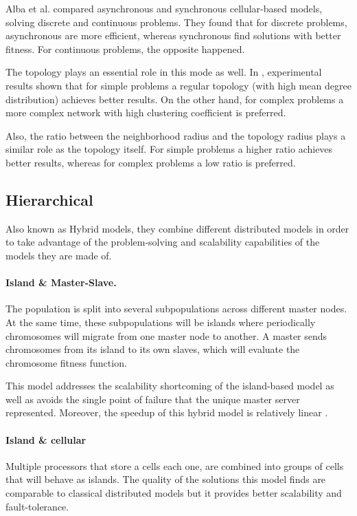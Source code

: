 Alba et al. \cite{2} compared asynchronous and synchronous cellular-based models, solving discrete and continuous problems. They found that for discrete problems, asynchronous are more efficient, whereas synchronous find solutions with better fitness. For continuous problems, the opposite happened.

The topology plays an essential role in this mode as well. In \cite{68}, experimental results shown that for simple problems a regular topology (with high mean degree distribution) achieves better results. On the other hand, for complex problems a more complex network with high clustering coefficient is preferred.

Also, the ratio between the neighborhood radius and the topology radius plays a similar role as the topology itself. For simple problems a higher ratio achieves better results, whereas for complex problems a low ratio is preferred.\cite{5}

\subsection{Hierarchical}
Also known as Hybrid models, they combine different distributed models in order to take advantage of the problem-solving and scalability capabilities of the models they are made of.

\paragraph*{Island \& Master-Slave.} The population is split into several subpopulations across different master nodes. At the same time, these subpopulations will be islands where periodically chromosomes will migrate from one master node to another. A master sends chromosomes from its island to its own slaves, which will evaluate the chromosome fitness function.

This model addresses the scalability shortcoming of the island-based model as well as avoids the single point of failure that the unique master server represented. Moreover, the speedup of this hybrid model is relatively linear \cite{13}.

\paragraph*{Island \& cellular} Multiple processors that store a cells each one, are combined into groups of cells that will behave as islands. The quality of the solutions this model finds are comparable to classical distributed models but it provides better scalability and fault-tolerance.

